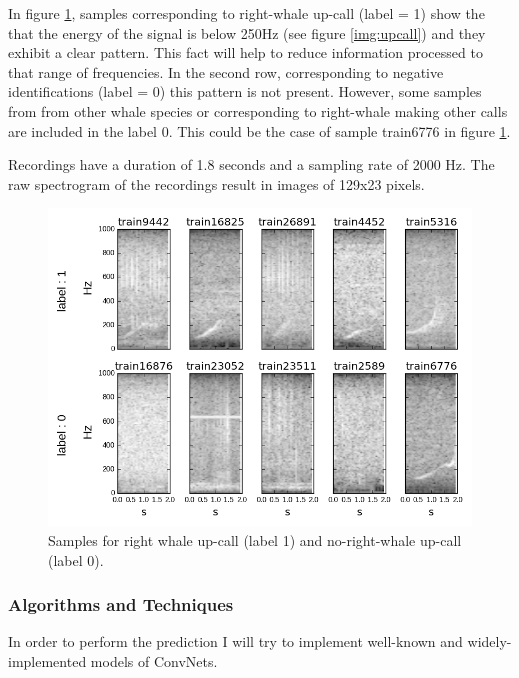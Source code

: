 \documentclass[]{article}
\begin{document}
In figure \ref{img:samples}, samples corresponding to right-whale up-call (label = 1) show the that the energy of the signal is below 250Hz (see figure \ref{img:upcall}) and they exhibit a clear pattern. This fact will help to reduce information processed to that range of frequencies. 
In the second row, corresponding to negative identifications (label = 0) this pattern is not present. However, some samples from from other whale species or corresponding to right-whale making other calls are included in the label 0. This could be the case of sample train6776 in figure \ref{img:samples}.

Recordings have a duration of 1.8 seconds and a sampling rate of 2000 Hz. The raw spectrogram of the recordings result in images of 129x23 pixels.

\begin{figure}[htpb!]
\centering
\includegraphics[width= \textwidth]{./images/2_samples}
\caption{Samples for right whale up-call (label 1) and no-right-whale up-call (label 0).  \label{img:samples}}
\end{figure} 


\subsubsection{Algorithms and
Techniques}\label{algorithms-and-techniques}

In order to perform the prediction I will try to implement well-known and widely-implemented models of ConvNets.
\end{document}
